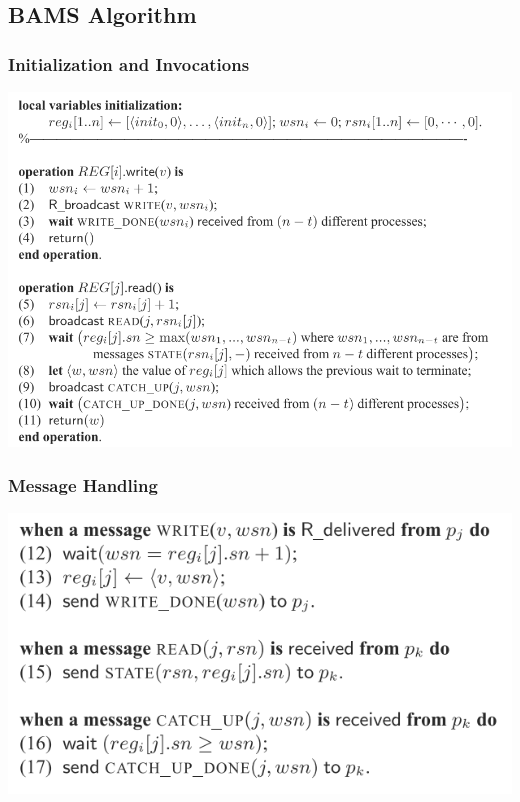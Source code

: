 
\subsection{BAMS Algorithm}

\begin{frame}
    \frametitle{Initialization and Invocations}
    \begin{center}
        \includegraphics[scale=.7]{alg1.png}
    \end{center}
\end{frame}
\begin{frame}
    \frametitle{Message Handling}
    \begin{center}
        \includegraphics[scale=.7]{alg2.png}
    \end{center}
\end{frame}
